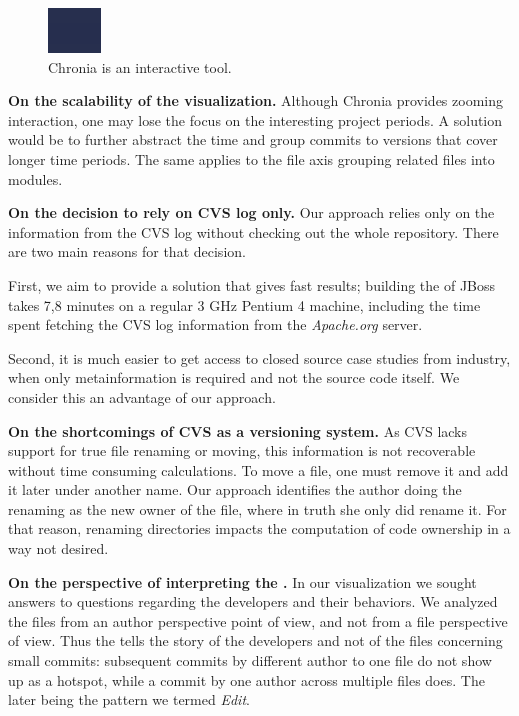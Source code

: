 \begin{figure}[htbp]
\begin{center}
\includegraphics{chronia}
\caption{Chronia is an interactive tool.}
\label{fig:chronia}
\end{center}
\end{figure}

\textbf{On the scalability of the visualization.} Although Chronia provides zooming interaction, one may lose the focus on the interesting project periods. A solution would be to further abstract the time and group commits to versions that cover longer time periods. The same applies to the file axis grouping related files into modules.

\textbf{On the decision to rely on CVS log only.} Our approach relies only on the information from the CVS log without checking out the whole repository. There are two main reasons for that decision.

First, we aim to provide a solution that gives fast results; \eg building the \omap of JBoss takes 7,8 minutes on a regular 3 GHz Pentium 4 machine, including the time spent fetching the CVS log information from the \textit{Apache.org} server.

Second, it is much easier to get access to closed source case studies from industry, when only metainformation is required and not the source code itself. We consider this an advantage of our approach.

\textbf{On the shortcomings of CVS as a versioning system.} As CVS lacks support for true file renaming or moving, this information is not recoverable without time consuming calculations. To move a file, one must remove it and add it later under another name. Our approach identifies the author doing the renaming as the new owner of the file, where in truth she only did rename it. For that reason, renaming directories impacts the computation of code ownership in a way not desired.

\textbf{On the perspective of interpreting the \omap.} In our visualization we sought answers to questions regarding the developers and their behaviors. We analyzed the files from an author perspective point of view, and not from a file perspective of view. Thus the \omap tells the story of the developers and not of the files \eg concerning small commits: subsequent commits by different author to one file do not show up as a hotspot, while a commit by one author across multiple files does. The later being the pattern we termed \textit{Edit}.


